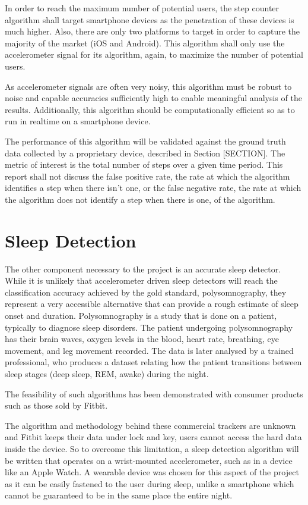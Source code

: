             In order to reach the maximum number of potential users, the step counter algorithm shall target smartphone devices as the penetration of these devices is much higher. Also, there are only two platforms to target in order to capture the majority of the market (iOS and Android). This algorithm shall only use the accelerometer signal for its algorithm, again, to maximize the number of potential users.

            As accelerometer signals are often very noisy, this algorithm must be robust to noise and capable accuracies sufficiently high to enable meaningful analysis of the results. Additionally, this algorithm should be computationally efficient so as to run in realtime on a smartphone device.

            The performance of this algorithm will be validated against the ground truth data collected by a proprietary device, described in Section [SECTION]. The metric of interest is the total number of steps over a given time period. This report shall not discuss the false positive rate, the rate at which the algorithm identifies a step when there isn't one, or the false negative rate, the rate at which the algorithm does not identify a step when there is one, of the algorithm.

        \section{Sleep Detection}

            The other component necessary to the project is an accurate sleep detector. While it is unlikely that accelerometer driven sleep detectors will reach the classification accuracy achieved by the gold standard, polysomnography, they represent a very accessible alternative that can provide a rough estimate of sleep onset and duration. Polysomnography is a study that is done on a patient, typically to diagnose sleep disorders. The patient undergoing polysomnography has their brain waves, oxygen levels in the blood, heart rate, breathing, eye movement, and leg movement recorded. The data is later analysed by a trained professional, who produces a dataset relating how the patient transitions between sleep stages (deep sleep, REM, awake) during the night.

            The feasibility of such algorithms has been demonstrated with consumer products such as those sold by Fitbit.

            The algorithm and methodology behind these commercial trackers are unknown and Fitbit keeps their data under lock and key, users cannot access the hard data inside the device. So to overcome this limitation, a sleep detection algorithm will be written that operates on a wrist-mounted accelerometer, such as in a device like an Apple Watch. A wearable device was chosen for this aspect of the project as it can be easily fastened to the user during sleep, unlike a smartphone which cannot be guaranteed to be in the same place the entire night.

